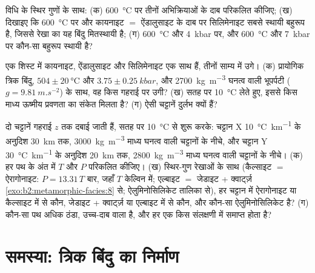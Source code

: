 \begin{exercise}[$\star\star\star$]\label{exo:b2:metamorphic-facies:10}
विधि के स्थिर गुणों के साथ: (क) \qty{600}{\celsius} पर तीनों
अभिक्रियाओं के दाब परिकलित कीजिए; (ख) दिखाइए कि \qty{600}{\celsius} पर और
कायनाइट $=$ ऐंडालुसाइट के दाब पर सिलिमेनाइट सबसे स्थायी बहुरूप है, जिससे रेखा का यह बिंदु
मितस्थायी है; (ग) \qty{600}{\celsius} और
\qty{4}{kbar} पर, और \qty{600}{\celsius} और \qty{7}{kbar} पर कौन-सा बहुरूप स्थायी है?
\end{exercise}

\begin{exercise}[$\star\star\star$]\label{exo:b2:metamorphic-facies:11}
एक शिस्ट में कायनाइट, ऐंडालुसाइट और सिलिमेनाइट एक साथ हैं, तीनों
साम्य में उगे। (क) प्रायोगिक त्रिक बिंदु, $504 \pm \qty{20}{\celsius}$ और
$3.75 \pm \qty{0.25}{kbar}$, और \qty{2700}{kg.m^{-3}} घनत्व वाली भूपर्पटी ($g =
\qty{9.81}{m.s^{-2}}$) के साथ, वह किस गहराई पर उगी? (ख) सतह पर \qty{10}{\celsius} लेते हुए,
इससे किस माध्य ऊष्मीय प्रवणता का संकेत मिलता है? (ग) ऐसी चट्टानें दुर्लभ क्यों हैं?
\end{exercise}

\begin{exercise}[$\star\star\star$]\label{exo:b2:metamorphic-facies:12}
दो चट्टानें गहराई $z$ तक दबाई जाती हैं, सतह पर \qty{10}{\celsius} से शुरू करके: चट्टान X
\qty{10}{\celsius.km^{-1}} के अनुदिश \qty{30}{km} तक, \qty{3000}{kg.m^{-3}} माध्य घनत्व वाली चट्टानों के नीचे,
और चट्टान Y \qty{30}{\celsius.km^{-1}} के अनुदिश \qty{20}{km} तक,
\qty{2800}{kg.m^{-3}} माध्य घनत्व वाली चट्टानों के नीचे। (क) हर पथ के अंत में $T$ और $P$ परिकलित कीजिए।
(ख) स्थिर-गुण रेखाओं के साथ (कैल्साइट $=$ ऐरागोनाइट: $P = 13.31\,T$ बार, जहाँ $T$
केल्विन में; एल्बाइट $=$ जेडाइट + क्वार्ट्ज़ \cref{exo:b2:metamorphic-facies:8} से; ऐलुमिनोसिलिकेट
तालिका से), हर चट्टान में ऐरागोनाइट या कैल्साइट में से कौन, जेडाइट + क्वार्ट्ज़ या एल्बाइट में से कौन, और कौन-सा
ऐलुमिनोसिलिकेट है? (ग) कौन-सा पथ अधिक ठंडा, उच्च-दाब वाला है, और हर एक किस संलक्षणी में समाप्त होता है?
\end{exercise}

\section{समस्या: त्रिक बिंदु का निर्माण}

